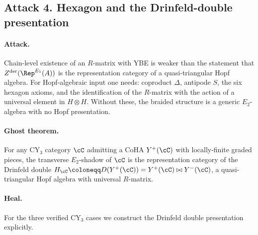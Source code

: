 \subsection*{Attack 4.  Hexagon and the Drinfeld-double presentation}

\paragraph{Attack.}  Chain-level existence of an $R$-matrix with YBE
is weaker than the statement that $Z^{\mathrm{der}}(\Rep^{E_1}(A))$
is the representation category of a quasi-triangular Hopf algebra.
For Hopf-algebraic input one needs: coproduct $\Delta$, antipode $S$,
the six hexagon axioms, and the identification of the $R$-matrix with
the action of a universal element in $H \otimes H$.  Without these,
the braided structure is a generic $E_2$-algebra with no Hopf
presentation.

\paragraph{Ghost theorem.}  For any CY$_3$ category $\cC$ admitting a
CoHA $Y^+(\cC)$ with locally-finite graded pieces, the transverse
$E_2$-shadow of $\cC$ is the representation category of the
Drinfeld double $H_\cC \coloneqq D(Y^+(\cC)) = Y^+(\cC) \bowtie
Y^-(\cC)$, a quasi-triangular Hopf algebra with universal $R$-matrix.

\paragraph{Heal.}  For the three verified CY$_3$ cases we construct the
Drinfeld double presentation explicitly.

